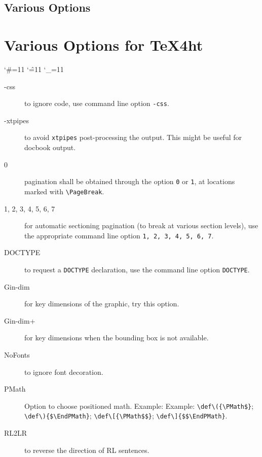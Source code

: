 \documentclass[a4paper]{article}
\begin{document}
\section{Various Options}
\else
\chapter{Various Options for \TeX4ht}
\fi

\catcode`\#=11 \catcode`\^=11 \catcode`\_=11

\begin{description}

\item[-css] to ignore \css code, use command line option \verb=-css=.

\item[-xtpipes] to avoid \verb=xtpipes= post-processing the
  output. This might be useful for docbook \xml output.


\item[0] pagination shall be obtained through the option \verb=0= or
  \verb=1=, at locations marked with \verb=\PageBreak=.

\item[1, 2, 3, 4, 5, 6, 7] for automatic sectioning pagination (to
  break at various section levels), use the appropriate command line
  option \verb=1, 2, 3, 4, 5, 6, 7=.

\item[DOCTYPE] to request a \verb=DOCTYPE= declaration, use the
  command line option \verb=DOCTYPE=.

\item[Gin-dim] for key dimensions of the graphic, try this option.

\item[Gin-dim+] for key dimensions when the bounding box is not
  available.

\item[NoFonts] to ignore \css font decoration.

\item[PMath] Option to choose positioned math. Example: Example:
  \Verb=\def\({\PMath$}=; \Verb=\def\){$\EndPMath}=;
  \Verb=\def\[{\PMath$$}=; \Verb=\def\]{$$\EndPMath}=.

\item[RL2LR] to reverse the direction of RL sentences.


\end{description}
\end{document}
